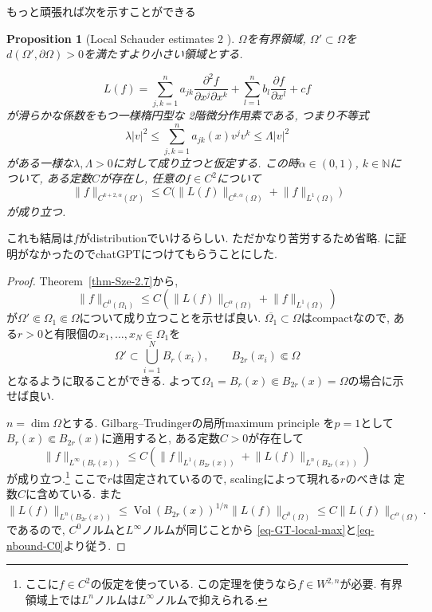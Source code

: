 \documentclass[dvipdfmx,a4paper,11pt]{article} %
\newtheorem{prop}[thm]{Proposition}
\theoremstyle{definition}
\theoremstyle{remark}
\numberwithin{equation}{section}
\begin{document}
もっと頑張れば次を示すことができる
\begin{prop}[Local Schauder estimates 2 {\cite[Proposition 2.8]{Sze14}}]
\label{prop-Sze-2.8}
$\Omega$を有界領域, 
$\Omega'\subset\Omega$を$d(\Omega',\partial\Omega)>0$を満たすより小さい領域とする. 

\[
L(f)=\sum_{j,k=1}^n a_{jk}\frac{\partial^2 f}{\partial x^j\partial x^k}
+\sum_{l=1}^n b_l\frac{\partial f}{\partial x^l}+cf
\]
が滑らかな係数をもつ一様楕円型な 2階微分作用素である, つまり不等式
\begin{equation}
\label{Sze-Schauder-18-2}
\lambda\lvert v\rvert^2\leq \sum_{j,k=1}^n a_{jk}(x)v^jv^k \leq \Lambda\lvert v\rvert^2
\end{equation}
がある一様な$\lambda,\Lambda>0$に対して成り立つと仮定する.
この時$\alpha\in(0,1)$, $k\in\mathbb{N}$について, 
ある定数$C$が存在し, 任意の$f \in C^2$について
\[
\lVert f\rVert_{C^{k+2,\alpha}(\Omega')}\leq C\bigl(\lVert L(f)\rVert_{C^{k,\alpha}(\Omega)}+\lVert f\rVert_{L^1(\Omega)}\bigr)
\]
が成り立つ.
\end{prop}
これも結局は$f$がdistributionでいけるらしい. ただかなり苦労するため省略.  
\cite[Proposition 2.8]{Sze14}に証明がなかったのでchatGPTにつけてもらうことにした. 

\begin{proof}
Theorem~\ref{thm-Sze-2.7}から, 
\[
\lVert f\rVert_{C^0(\Omega_1)}
\leq
C\left(
\lVert L(f)\rVert_{C^\alpha(\Omega)}
+
\lVert f\rVert_{L^1(\Omega)}
\right)
\]
が$\Omega'\Subset\Omega_1\Subset\Omega$について成り立つことを示せば良い.
$\overline{\Omega_1}\subset\Omega$はcompactなので, 
ある$r>0$と有限個の$x_1,\ldots,x_N\in\Omega_1$を
\[
\Omega'\subset\bigcup_{i=1}^N B_r(x_i),
\qquad
B_{2r}(x_i)\Subset\Omega
\]
となるように取ることができる. よって$\Omega_1=B_r(x)\Subset B_{2r}(x) = \Omega$の場合に示せば良い. 

$n=\dim \Omega$とする. 
Gilbarg--Trudingerの局所maximum principle
\cite[Corollary 9.21]{GT01}を$p=1$として
$B_r(x)\Subset B_{2r}(x)$に適用すると, 
ある定数$C>0$が存在して
\begin{equation}
\label{eq-GT-local-max}
\lVert f\rVert_{L^\infty(B_r(x))}
\leq
C\left(
\lVert f\rVert_{L^1(B_{2r}(x))}
+
\lVert L(f)\rVert_{L^n(B_{2r}(x))}
\right)
\end{equation}
が成り立つ.\footnote{ここに$f \in C^2$の仮定を使っている. この定理を使うなら$f \in W^{2, n}$が必要. 有界領域上では$L^n$ノルムは$L^\infty$ノルムで抑えられる.}
ここで$r$は固定されているので, scalingによって現れる$r$のべきは
定数$C$に含めている. また
\begin{equation}
\label{eq-nbound-C0}
\lVert L(f)\rVert_{L^n(B_{2r}(x))}
\leq
\operatorname{Vol}(B_{2r}(x))^{1/n}
\lVert L(f)\rVert_{C^0(\Omega)}
\leq
C\lVert L(f)\rVert_{C^\alpha(\Omega)}.
\end{equation}
であるので, $C^0$ノルムと$L^\infty$ノルムが同じことから
\eqref{eq-GT-local-max}と\eqref{eq-nbound-C0}より従う. 
\end{proof}
\end{document}
